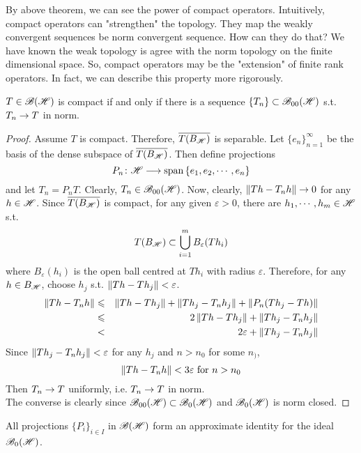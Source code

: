 \documentclass[a4paper,11pt]{report}
\begin{document}
By above theorem, we can see the power of compact operators. Intuitively, compact operators can "strengthen" the topology. They map the weakly convergent sequences be norm convergent sequence. How can they do that? We have known the weak topology is agree with the norm topology on the finite dimensional space. So, compact operators may be the "extension" of finite rank operators. In fact, we can describe this property more rigorously.

\begin{thm}
	$T \in \mathscr{B(H)}$ is compact if and only if there is a sequence $\{T_n\} \subset \mathscr{B}_{00}\mathscr{(H)}$ s.t. $T_n \rightarrow T$ in norm.
\end{thm}
\begin{proof}
	Assume $T$ is compact. Therefore, $\overline{T(B_{\mathscr{H}})}$ is separable. Let $\{e_n\}_{n=1}^{\infty}$ be the basis of the dense subspace of $\overline{T(B_{\mathscr{H}})}$. Then define projections
	\begin{equation*}
		P_n \colon \mathscr{H} \longrightarrow \operatorname{span}{\{e_1, e_2, \cdots, e_n\}}
	\end{equation*}
	and let $T_n = P_nT$. Clearly, $T_n \in \mathscr{B}_{00}\mathscr{(H)}$. Now, clearly, $\left\lVert Th - T_nh\right\lVert \rightarrow 0$ for any $h \in \mathscr{H}$. Since $\overline{T(B_{\mathscr{H}})}$ is compact, for any given $\varepsilon > 0$, there are $h_1, \cdots, h_m \in \mathscr{H}$ s.t.
	\begin{equation*}
		T(B_{\mathscr{H}}) \subset \bigcup_{i=1}^{m}B_{\varepsilon}(Th_i)
	\end{equation*}
	where $B_{\varepsilon}(h_i)$ is the open ball centred at $Th_i$ with radius $\varepsilon$. Therefore, for any $h \in B_{\mathscr{H}}$, choose $h_j$ s.t. $\left\lVert Th-Th_j\right\lVert < \varepsilon$.
	\begin{eqnarray*}
		\left\lVert Th-T_nh\right\lVert &\leqslant& \left\lVert Th - Th_j\right\lVert + \left\lVert Th_j - T_nh_j\right\lVert + \left\lVert P_n(Th_j-Th)\right\lVert \\
		&\leqslant& 2\left\lVert Th - Th_j\right\lVert +  \left\lVert Th_j - T_nh_j\right\lVert \\
		&<& 2\varepsilon +  \left\lVert Th_j - T_nh_j\right\lVert
	\end{eqnarray*}
	Since $\left\lVert Th_j - T_{n}h_j\right\lVert < \varepsilon$ for any $h_j$ and $n > n_0$ for some $n_)$,  
	\begin{equation*}
		\left\lVert Th-T_nh\right\lVert < 3\varepsilon \text{ for } n > n_0
	\end{equation*}
	Then $T_n \rightarrow T$ uniformly, i.e. $T_n \rightarrow T$ in norm. \\
	The converse is clearly since $\mathscr{B}_{00}\mathscr{(H)} \subset \mathscr{B}_{0}\mathscr{(H)}$ and $\mathscr{B}_{0}\mathscr{(H)}$ is norm closed.
\end{proof}
\begin{cor}
	All projections $\{P_i\}_{i \in I}$ in $\mathscr{B(H)}$ form an approximate identity for the ideal $\mathscr{B}_{0}\mathscr{(H)}$.
\end{cor}
\end{document}
